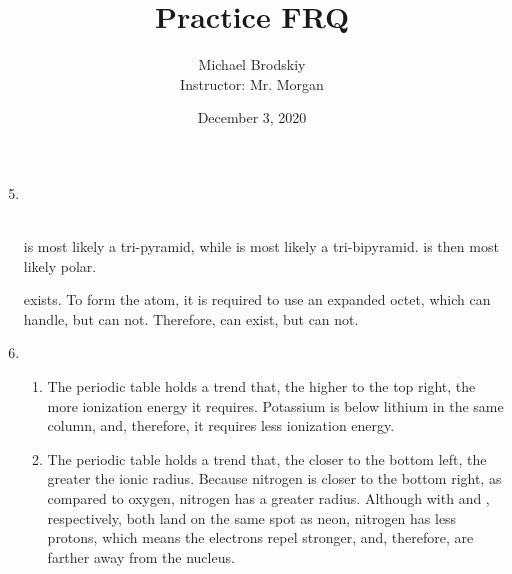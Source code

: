 \documentclass[12pt]{article}
\title{Practice FRQ}
\date{December 3, 2020}
\author{Michael Brodskiy\\ \small Instructor: Mr. Morgan}
\begin{document}
\maketitle

\begin{enumerate}
    \setcounter{enumi}{4}

  \item \hspace{20pt}\\
    \vspace{50pt}
    \hspace{20pt}\\

    \begin{center}

       is most likely a tri-pyramid, while  is most likely a tri-bipyramid.  is then most likely polar. 

    \end{center}
    \begin{center}

     exists. To form the atom, it is required to use an expanded octet, which  can handle, but  can not. Therefore,  can exist, but  can not.

    \end{center}

    \setcounter{enumi}{5}

  \item

    \begin{enumerate}

      \item The periodic table holds a trend that, the higher to the top right, the more ionization energy it requires. Potassium is below lithium in the same column, and, therefore, it requires less ionization energy.

      \item The periodic table holds a trend that, the closer to the bottom left, the greater the ionic radius. Because nitrogen is closer to the bottom right, as compared to oxygen, nitrogen has a greater radius. Although with  and , respectively, both land on the same spot as neon, nitrogen has less protons, which means the electrons repel stronger, and, therefore, are farther away from the nucleus.


\end{enumerate}
\end{enumerate}
\end{document}

